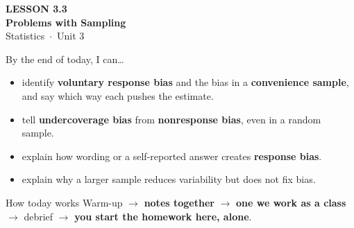 \documentclass[aspectratio=169, 11pt]{beamer}
\begin{document}
{
\begin{frame}[plain]
  \vspace{2.8cm}\hspace{0.55cm}%
  \begin{minipage}{0.9\textwidth}
    {\color{goldacc}\bfseries\small LESSON 3.3}\\[0.5cm]
    {\color{white}\bfseries\LARGE Problems with Sampling}\\[1.2cm]
    {\color{skymid}\small Statistics~$\cdot$~Unit 3}
  \end{minipage}
\end{frame}
}

\newcommand{\redink}[1]{{\color{redacc}\bfseries #1}}

\begin{frame}[t, plain]
  By the end of today, I can\ldots
  \begin{itemize}\setlength{\itemsep}{4pt}
    \item identify \textbf{voluntary response bias} and the bias in a \textbf{convenience
          sample}, and say which way each pushes the estimate.
    \item tell \textbf{undercoverage bias} from \textbf{nonresponse bias}, even in a random
          sample.
    \item explain how wording or a self-reported answer creates \textbf{response bias}.
    \item explain why a larger sample reduces variability but does not fix bias.
  \end{itemize}
  \begin{block}{How today works}
    Warm-up $\to$ \textbf{notes together} $\to$ \textbf{one we work as a class} $\to$
    debrief $\to$ \textbf{you start the homework here, alone}.
  \end{block}
\end{frame}
\end{document}
